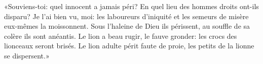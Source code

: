 «Souviens-toi: quel innocent a jamais péri?
En quel lieu des hommes droits ont-ils disparu?
Je l’ai bien vu, moi:
	les laboureurs d’iniquité et les semeurs de misère eux-mêmes la moissonnent.
Sous l’haleine de Dieu ils périssent, au souffle de sa colère ils sont anéantis.
Le lion a beau rugir, le fauve gronder: les crocs des lionceaux seront brisés.
	Le lion adulte périt faute de proie, les petits de la lionne se dispersent.»
